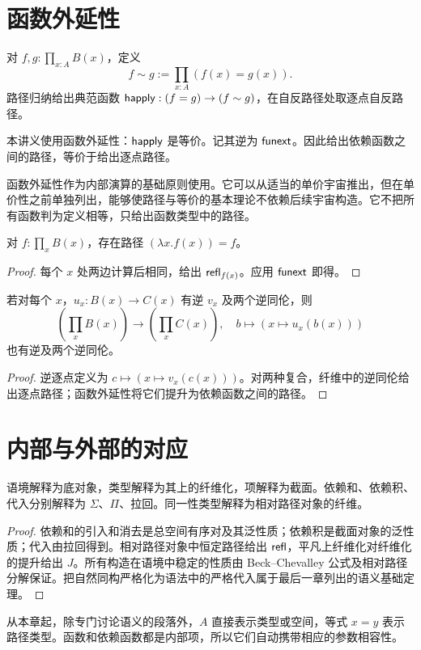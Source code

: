 \section{函数外延性}
\begin{definition}[逐点同伦]
对 $f,g:\prod_{x:A}B(x)$，定义
\[
f\sim g:=\prod_{x:A}(f(x)=g(x)).
\]
路径归纳给出典范函数 $\mathsf{happly}:(f=g)\to(f\sim g)$，在自反路径处取逐点自反路径。
\end{definition}
\begin{definition}[函数外延性规则]
本讲义使用函数外延性：$\mathsf{happly}$ 是等价。记其逆为 $\mathsf{funext}$。因此给出依赖函数之间的路径，等价于给出逐点路径。
\end{definition}
\begin{remark}
函数外延性作为内部演算的基础原则使用。它可以从适当的单价宇宙推出，但在单价性之前单独列出，能够使路径与等价的基本理论不依赖后续宇宙构造。它不把所有函数判为定义相等，只给出函数类型中的路径。
\end{remark}
\begin{proposition}
对 $f:\prod_xB(x)$，存在路径 $(\lambda x.f(x))=f$。
\end{proposition}
\begin{proof}
每个 $x$ 处两边计算后相同，给出 $\mathsf{refl}_{f(x)}$。应用 $\mathsf{funext}$ 即得。
\end{proof}
\begin{proposition}[逐点等价诱导积上的等价]
若对每个 $x$，$u_x:B(x)\to C(x)$ 有逆 $v_x$ 及两个逆同伦，则
\[
\left(\prod_xB(x)\right)\to\left(\prod_xC(x)\right),
\quad b\mapsto(x\mapsto u_x(b(x)))
\]
也有逆及两个逆同伦。
\end{proposition}
\begin{proof}
逆逐点定义为 $c\mapsto(x\mapsto v_x(c(x)))$。对两种复合，纤维中的逆同伦给出逐点路径；函数外延性将它们提升为依赖函数之间的路径。
\end{proof}

\section{内部与外部的对应}
\begin{proposition}[类型规则的纤维化解释]
语境解释为底对象，类型解释为其上的纤维化，项解释为截面。依赖和、依赖积、代入分别解释为 $\Sigma$、$\Pi$、拉回。同一性类型解释为相对路径对象的纤维。
\end{proposition}
\begin{proof}
依赖和的引入和消去是总空间有序对及其泛性质；依赖积是截面对象的泛性质；代入由拉回得到。相对路径对象中恒定路径给出 $\mathsf{refl}$，平凡上纤维化对纤维化的提升给出 $J$。所有构造在语境中稳定的性质由 Beck--Chevalley 公式及相对路径分解保证。把自然同构严格化为语法中的严格代入属于最后一章列出的语义基础定理。
\end{proof}
\begin{remark}
从本章起，除专门讨论语义的段落外，$A$ 直接表示类型或空间，等式 $x=y$ 表示路径类型。函数和依赖函数都是内部项，所以它们自动携带相应的参数相容性。
\end{remark}
